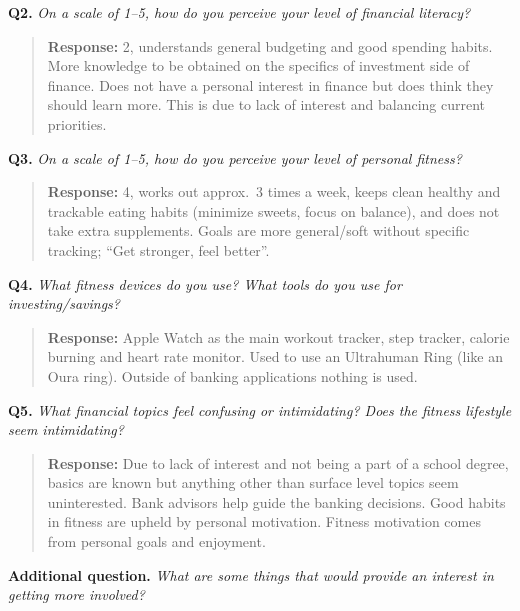 \documentclass[12pt]{article}
\begin{document}
\medskip
\noindent\textbf{Q2.} \textit{On a scale of 1--5, how do you perceive your level of financial literacy?}

\begin{quote}
\textbf{Response:} 2, understands general budgeting and good spending habits. More knowledge to be obtained on the specifics of investment side of finance. Does not have a personal interest in finance but does think they should learn more. This is due to lack of interest and balancing current priorities.\par
\end{quote}

\medskip
\noindent\textbf{Q3.} \textit{On a scale of 1--5, how do you perceive your level of personal fitness?}

\begin{quote}
\textbf{Response:} 4, works out approx.\ 3 times a week, keeps clean healthy and trackable eating habits (minimize sweets, focus on balance), and does not take extra supplements. Goals are more general/soft without specific tracking; ``Get stronger, feel better''.\par
\end{quote}

\medskip
\noindent\textbf{Q4.} \textit{What fitness devices do you use? What tools do you use for investing/savings?}

\begin{quote}
\textbf{Response:} Apple Watch as the main workout tracker, step tracker, calorie burning and heart rate monitor. Used to use an Ultrahuman Ring (like an Oura ring). Outside of banking applications nothing is used.\par
\end{quote}

\medskip
\noindent\textbf{Q5.} \textit{What financial topics feel confusing or intimidating? Does the fitness lifestyle seem intimidating?}

\begin{quote}
\textbf{Response:} Due to lack of interest and not being a part of a school degree, basics are known but anything other than surface level topics seem uninterested. Bank advisors help guide the banking decisions. Good habits in fitness are upheld by personal motivation. Fitness motivation comes from personal goals and enjoyment.\par
\end{quote}

\medskip
\noindent\textbf{Additional question.} \textit{What are some things that would provide an interest in getting more involved?}
\end{document}
